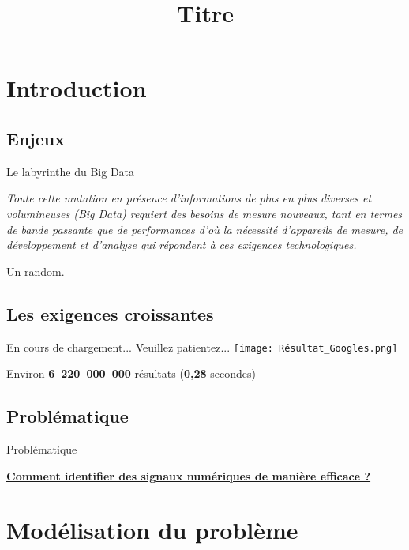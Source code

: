 \documentclass[10pt]{beamer}
\title{Titre}
\begin{document}
\frame{\titlepage}

\setcounter{section}{3}

\section{Introduction}

\subsection{Enjeux}


\begin{frame}{Le labyrinthe du Big Data}
\begin{center}
\textit{Toute cette mutation en présence d'informations de plus en plus diverses et
volumineuses (Big Data) requiert des besoins de mesure nouveaux, tant en
termes de bande passante que de performances d'où la nécessité d'appareils
de mesure, de développement et d'analyse qui répondent à ces exigences
technologiques.}
\end{center}
\begin{flushright}
Un random.
\end{flushright}

\end{frame}



\subsection{Les exigences croissantes}


\begin{frame}{En cours de chargement... Veuillez patientez...}
\texttt{[image: Résultat\_Googles.png]}
\begin{center}
	Environ \textbf{6\ 220\ 000\ 000} résultats (\textbf{0,28} secondes)
\end{center}
\end{frame}

\subsection{Problématique}
\begin{frame}{Problématique}
	\begin{center}
		\textbf{\underline{Comment identifier des signaux numériques de manière efficace ?}}
	\end{center}
\end{frame}

\section{Modélisation du problème}
\end{document}
